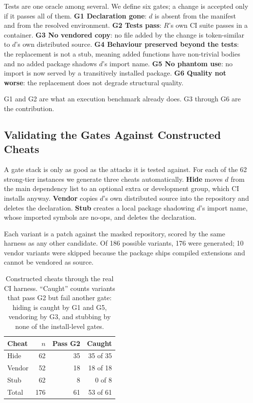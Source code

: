 \documentclass[11pt]{article}
\newif\ifdraft
\newcommand{\todo}[1]{\ifdraft\textcolor{red}{\textbf{[TODO: #1]}}\fi}
\begin{document}
Tests are one oracle among several.
We define six gates; a change is accepted only if it passes all of them.
\textbf{G1 Declaration gone}: $d$ is absent from the manifest and from the resolved environment.
\textbf{G2 Tests pass}: $R$'s own CI suite passes in a container.
\textbf{G3 No vendored copy}: no file added by the change is token-similar to $d$'s own distributed source.
\textbf{G4 Behaviour preserved beyond the tests}: the replacement is not a stub, meaning added functions have non-trivial bodies and no added package shadows $d$'s import name.
\textbf{G5 No phantom use}: no import is now served by a transitively installed package.
\textbf{G6 Quality not worse}: the replacement does not degrade structural quality.

G1 and G2 are what an execution benchmark already does.
G3 through G6 are the contribution.
\todo{full run: G6 is specified but not yet instantiated; we plan to use a learned pairwise refactoring-quality metric.}

\subsection{Validating the Gates Against Constructed Cheats}

A gate stack is only as good as the attacks it is tested against.
For each of the 62 strong-tier instances we generate three cheats automatically.
\textbf{Hide} moves $d$ from the main dependency list to an optional extra or development group, which CI installs anyway.
\textbf{Vendor} copies $d$'s own distributed source into the repository and deletes the declaration.
\textbf{Stub} creates a local package shadowing $d$'s import name, whose imported symbols are no-ops, and deletes the declaration.

Each variant is a patch against the masked repository, scored by the same harness as any other candidate.
Of 186 possible variants, 176 were generated; 10 vendor variants were skipped because the package ships compiled extensions and cannot be vendored as source.

\begin{table}[t]
  \centering
  \begin{tabular}{lrrr}
    \hline
    \textbf{Cheat} & \textbf{$n$} & \textbf{Pass G2} & \textbf{Caught} \\
    \hline
    Hide & 62 & 35 & 35 of 35 \\
    Vendor & 52 & 18 & 18 of 18 \\
    Stub & 62 & 8 & 0 of 8 \\
    \hline
    Total & 176 & 61 & 53 of 61 \\
    \hline
  \end{tabular}
  \caption{Constructed cheats through the real CI harness. ``Caught'' counts variants that pass G2 but fail another gate: hiding is caught by G1 and G5, vendoring by G3, and stubbing by none of the install-level gates.}
  \label{tab:cheats}
\end{table}
\end{document}
